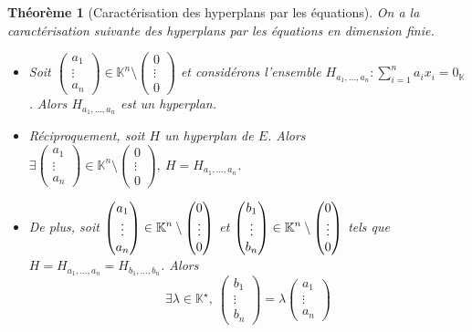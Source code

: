 \documentclass[french]{book}
\newcommand{\K}{\mathbb{K}}
\newcommand{\st}{^\star}
\theoremstyle{plain}
\newtheorem{thm}{Théorème}[chapter]
\theoremstyle{definition}
\theoremstyle{remark}
\begin{document}
\begin{thm}[Caractérisation des hyperplans par les équations]
	On a la caractérisation suivante des hyperplans par les équations en dimension finie.
	\begin{itemize}
		\item Soit $\displaystyle\begin{pmatrix}a_1\\ \vdots \\ a_n\end{pmatrix}\in\K^n\setminus\begin{pmatrix}0\\ \vdots\\ 0\end{pmatrix}$ et considérons l'ensemble $\displaystyle H_{a_1,\ldots,a_n} : \sum_{i=1}^{n}a_ix_i=0_\K$. Alors $\displaystyle H_{a_1,\ldots,a_n}$ est un hyperplan.
		\item Réciproquement, soit $H$ un hyperplan de $E$. Alors $\displaystyle\exists\displaystyle\begin{pmatrix}a_1\\ \vdots \\ a_n\end{pmatrix}\in\K^n\setminus\begin{pmatrix}0\\ \vdots\\ 0\end{pmatrix},\ H=H_{a_1,\ldots,a_n}$.
		\item De plus, soit $\displaystyle\displaystyle\begin{pmatrix}a_1\\ \vdots \\ a_n\end{pmatrix}\in\K^n\setminus\begin{pmatrix}0\\ \vdots\\ 0\end{pmatrix}$ et $\displaystyle\displaystyle\begin{pmatrix}b_1\\ \vdots \\ b_n\end{pmatrix}\in\K^n\setminus\begin{pmatrix}0\\ \vdots\\ 0\end{pmatrix}$ tels que $H=H_{a_1,\ldots,a_n}=H_{b_1,\ldots,b_n}$. Alors $$\exists\lambda\in\K\st,\ \begin{pmatrix}b_1\\ \vdots \\ b_n\end{pmatrix}=\lambda \begin{pmatrix}a_1\\ \vdots \\ a_n\end{pmatrix}$$
	\end{itemize}
\end{thm}
\end{document}
